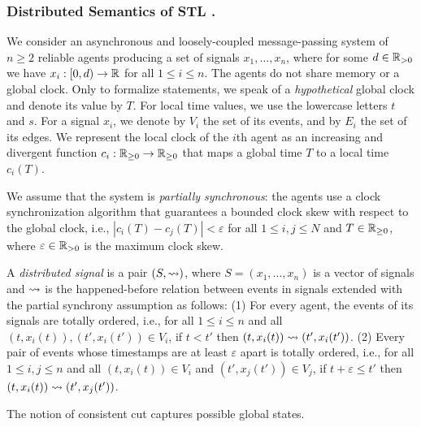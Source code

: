 \subsubsection{Distributed Semantics of STL \cite{MomtazAB23}.}
We consider an asynchronous and loosely-coupled message-passing system of $n \geq 2$ reliable agents producing a set of signals $x_1, \ldots, x_n$, where for some $d \in \mathbb{R}_{> 0}$ we have $x_i : [0,d) \to \mathbb{R}$ for all $1 \leq i \leq n$.
%
The agents do not share memory or a global clock.
%
Only to formalize statements, we speak of a \emph{hypothetical} global clock and denote its value by $T$.
%
For local time values, we use the lowercase letters $t$ and $s$.
For a signal $x_i$, we denote by $V_i$ the set of its events, and by $E_i$ the set of its edges.
%
We represent the local clock of the $i$th agent as an increasing and divergent function $c_i : 
\mathbb{R}_{\geq 0} \to \mathbb{R}_{\geq 0}$ that maps a global time $T$ to a local time $c_i(T)$.

We assume that the system is \emph{partially synchronous}: the agents use a clock synchronization algorithm that guarantees a bounded clock skew with respect to the global clock, i.e., $|c_i(T) - c_j(T)| < \varepsilon$ for all $1 \leq i,j \leq N$ and $T \in \mathbb{R}_{\geq 0}$, where $\varepsilon \in \mathbb{R}_{> 0}$ is the maximum clock skew.

\begin{definition} \label{defn:hb}
	A \emph{distributed signal} is a pair $(S, {\rightsquigarrow})$, where $S = (x_1, \ldots, x_n)$ is a vector of 
	signals and ${\rightsquigarrow}$ is the happened-before relation between events in signals extended with the 
	partial synchrony assumption as follows:
	(1) For every agent, the events of its signals are totally ordered, i.e., for all $1 \leq i \leq n$ and all $(t, x_i(t)), (t', x_i(t')) \in V_i$, if $t < t'$ then $(t, x_i(t)) \rightsquigarrow (t', x_i(t'))$.
	(2) Every pair of events whose timestamps are at least $\varepsilon$ apart is totally ordered, i.e., for all $1 \leq i,j \leq n$ and all $(t, x_i(t)) \in V_i$ and $(t', x_j(t')) \in V_j$, if $t + \varepsilon \leq t'$ then $(t, x_i(t)) \rightsquigarrow (t', x_j(t'))$.
\end{definition}

The notion of consistent cut captures possible global states.

